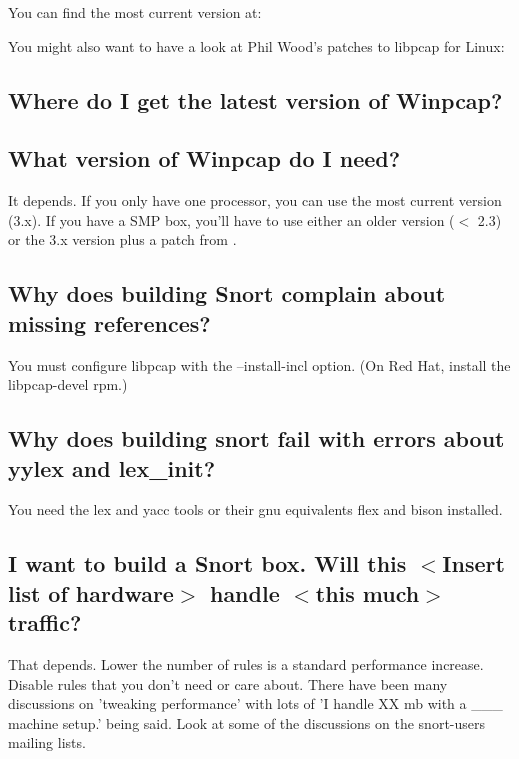 \documentclass{article}
\begin{document}
You can find the most current version at:


You might also want to have a look at Phil Wood's patches to libpcap for Linux:

    
\subsection{Where do I get the latest version of Winpcap?}


\subsection{What version of Winpcap do I need?\label{winpcap}}

It depends. If you only have one processor, you can use the most current
version (3.x). If you have a SMP box, you'll have to use either an older
version ($<$ 2.3) or the 3.x version plus a patch from .

\subsection{Why does building Snort complain about missing references? }

You must configure libpcap with the --install-incl option.  (On Red Hat, 
install the libpcap-devel rpm.)

\subsection{Why does building snort fail with errors about yylex and lex\_init? }

You need the lex and yacc tools or their gnu equivalents flex and bison 
installed.

\subsection{I want to build a Snort box.  Will this $<$Insert list of hardware$>$ handle $<$this much$>$ traffic? }

That depends. Lower the number of rules is a standard performance increase.
Disable rules that you don't need or care about. There have been many
discussions on 'tweaking performance' with lots of 'I handle XX mb with a \_\_\_
machine setup.' being said. Look at some of the discussions on the snort-users
mailing lists.
\end{document}
